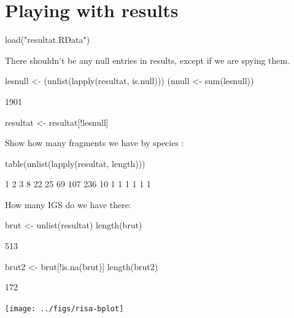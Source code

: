 \documentclass{article}
\begin{document}
\section{Playing with results}

\begin{Schunk}
\begin{Sinput}
 load("resultat.RData")
\end{Sinput}
\end{Schunk}

There shouldn't be any null entries in results, except if we are
spying them.

\begin{Schunk}
\begin{Sinput}
 lesnull <- (unlist(lapply(resultat, is.null)))
 (nnull <- sum(lesnull))
\end{Sinput}
\begin{Soutput}
[1] 1901
\end{Soutput}
\begin{Sinput}
 resultat <- resultat[!lesnull]
\end{Sinput}
\end{Schunk}

Show how many fragments we have by species :

\begin{Schunk}
\begin{Sinput}
 table(unlist(lapply(resultat, length)))
\end{Sinput}
\begin{Soutput}
  1   2   3   8  22  25  69 107 
236  10   1   1   1   1   1   1 
\end{Soutput}
\end{Schunk}

How many IGS do we have there:

\begin{Schunk}
\begin{Sinput}
 brut <- unlist(resultat)
 length(brut)
\end{Sinput}
\begin{Soutput}
[1] 513
\end{Soutput}
\begin{Sinput}
 brut2 <- brut[!is.na(brut)]
 length(brut2)
\end{Sinput}
\begin{Soutput}
[1] 172
\end{Soutput}
\end{Schunk}

\begin{Schunk}
\end{Schunk}
\texttt{[image: ../figs/risa-bplot]}
\end{document}
